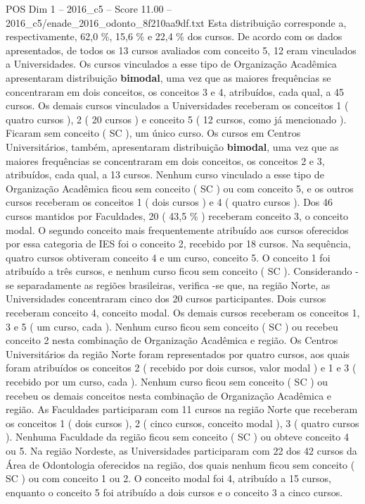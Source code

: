\begin{textsample}{POS Dim 1 – 2016\_c5 – Score 11.00 – 2016\_c5/enade\_2016\_odonto\_8f210aa9df.txt}
Esta distribuição corresponde a, respectivamente, 62,0 \%, 15,6 \% e 22,4 \% dos cursos.
De acordo com os dados apresentados, de todos os 13 cursos avaliados com conceito 5, 12 eram vinculados a Universidades.
Os cursos vinculados a esse tipo de Organização Acadêmica apresentaram distribuição \textbf{bimodal}, uma vez que as maiores frequências se concentraram em dois conceitos, os conceitos 3 e 4, atribuídos, cada qual, a 45 cursos.
Os demais cursos vinculados a Universidades receberam os conceitos 1 ( quatro cursos ), 2 ( 20 cursos ) e conceito 5 ( 12 cursos, como já mencionado ).
Ficaram sem conceito ( SC ), um único curso.
Os cursos em Centros Universitários, também, apresentaram distribuição \textbf{bimodal}, uma vez que as maiores frequências se concentraram em dois conceitos, os conceitos 2 e 3, atribuídos, cada qual, a 13 cursos.
Nenhum curso vinculado a esse tipo de Organização Acadêmica ficou sem conceito ( SC ) ou com conceito 5, e os outros cursos receberam os conceitos 1 ( dois cursos ) e 4 ( quatro cursos ).
Dos 46 cursos mantidos por Faculdades, 20 ( 43,5 \% ) receberam conceito 3, o conceito modal.
O segundo conceito mais frequentemente atribuído aos cursos oferecidos por essa categoria de IES foi o conceito 2, recebido por 18 cursos.
Na sequência, quatro cursos obtiveram conceito 4 e um curso, conceito 5.
O conceito 1 foi atribuído a três cursos, e nenhum curso ficou sem conceito ( SC ).
Considerando -se separadamente as regiões brasileiras, verifica -se que, na região Norte, as Universidades concentraram cinco dos 20 cursos participantes.
Dois cursos receberam conceito 4, conceito modal.
Os demais cursos receberam os conceitos 1, 3 e 5 ( um curso, cada ).
Nenhum curso ficou sem conceito ( SC ) ou recebeu conceito 2 nesta combinação de Organização Acadêmica e região.
Os Centros Universitários da região Norte foram representados por quatro cursos, aos quais foram atribuídos os conceitos 2 ( recebido por dois cursos, valor modal ) e 1 e 3 ( recebido por um curso, cada ).
Nenhum curso ficou sem conceito ( SC ) ou recebeu os demais conceitos nesta combinação de Organização Acadêmica e região.
As Faculdades participaram com 11 cursos na região Norte que receberam os conceitos 1 ( dois cursos ), 2 ( cinco cursos, conceito modal ), 3 ( quatro cursos ).
Nenhuma Faculdade da região ficou sem conceito ( SC ) ou obteve conceito 4 ou 5.
Na região Nordeste, as Universidades participaram com 22 dos 42 cursos da Área de Odontologia oferecidos na região, dos quais nenhum ficou sem conceito ( SC ) ou com conceito 1 ou 2.
O conceito modal foi 4, atribuído a 15 cursos, enquanto o conceito 5 foi atribuído a dois cursos e o conceito 3 a cinco cursos.

\end{textsample}
